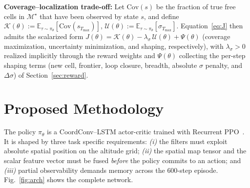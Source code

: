 \documentclass[runningheads]{llncs}
\begin{document}
\noindent\textbf{Coverage--localization trade-off:} Let $\mathrm{Cov}(s)$ be the fraction of true free cells in $\mathcal{M}^{\star}$ that have been observed by state $s$, and define $\mathcal{K}(\theta)\!:=\!\mathbb{E}_{\tau\sim\pi_\theta}[\mathrm{Cov}(s_{T_{\max}})]$, $\mathcal{U}(\theta)\!:=\!\mathbb{E}_{\tau\sim\pi_\theta}[\sigma_{T_{\max}}]$. Equation~\eqref{eq:J} then admits the scalarized form $J(\theta) = \mathcal{K}(\theta) - \lambda_\sigma\,\mathcal{U}(\theta) + \Psi(\theta)$ (coverage maximization, uncertainty minimization, and shaping, respectively), with $\lambda_\sigma\!>\!0$ realized implicitly through the reward weights and $\Psi(\theta)$ collecting the per-step shaping terms (new cell, frontier, loop closure, breadth, absolute $\sigma$ penalty, and $\Delta\sigma$) of Section~\ref{sec:reward}.

\section{Proposed Methodology}\label{sec:arch}

The policy $\pi_\theta$ is a CoordConv--LSTM actor-critic trained with Recurrent PPO~\cite{raffin2021sb3,ni2022recurrent}. It is shaped by three task specific requirements: \emph{(i)} the filters must exploit absolute spatial position on the altitude grid; \emph{(ii)} the spatial map tensor and the scalar feature vector must be fused \emph{before} the policy commits to an action; and \emph{(iii)} partial observability demands memory across the $600$-step episode. Fig.~\ref{fig:arch} shows the complete network.
\end{document}
